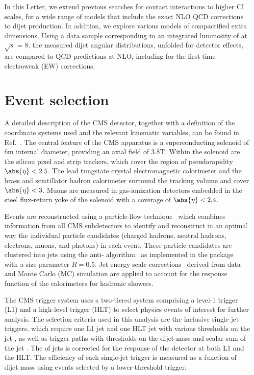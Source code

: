 \documentclass[11pt,twoside,a4paper,cmspaper,final,collab]{cms-tdr}
\begin{document}
In this Letter, we extend previous searches for contact
interactions to higher CI scales, for a wide range of models that
include the exact NLO QCD corrections to dijet production. In addition, we explore
various models of compactified extra dimensions. Using a data sample corresponding to an integrated luminosity of
\intlumi at $\sqrt s$ = 8\TeV, the measured dijet angular distributions, unfolded for
detector effects, are compared to QCD predictions at NLO, including
for the first time electroweak (EW) corrections.

\section{Event selection}

A detailed description of the CMS detector,
together with a definition of the coordinate
systems used and the relevant kinematic variables,
can be found in Ref.~\cite{bib_CMS}.
The central feature of the CMS apparatus is a superconducting solenoid of
6\unit{m} internal diameter, providing an axial field of
3.8\unit{T}. Within the solenoid are the silicon pixel and strip
trackers, which cover the region of pseudorapidity $\abs{\eta} < 2.5$.
The lead tungstate crystal electromagnetic calorimeter and the
brass and scintillator hadron calorimeter surround the tracking volume and
cover $\abs{\eta} < 3$.
Muons are measured in gas-ionization detectors embedded
in the steel flux-return yoke of the solenoid with a coverage of $\abs{\eta} <
2.4$.

Events are reconstructed using a particle-flow
technique~\cite{CMS-PAS-PFT-09-001,CMS-PAS-PFT-10-001} which combines
information from all CMS subdetectors to identify and reconstruct in
an optimal way the
individual particle candidates (charged hadrons, neutral hadrons,
electrons, muons, and photons) in each event. These particle
candidates are clustered into jets using the anti-\kt
algorithm~\cite{Cacciari:2008gp} as implemented in the \fastjet
package~\cite{Cacciari:2011ma} with a size parameter $R = 0.5$. Jet
energy scale corrections~\cite{bib_jecjinst} derived from data and
Monte Carlo (MC) simulation are applied
to account for the response function of the calorimeters for hadronic showers.

The CMS trigger system uses a two-tiered system comprising a level-1 trigger
(L1) and a high-level trigger (HLT) to select physics events of
interest for further analysis. The selection criteria used in this analysis
are the inclusive single-jet triggers, which require one L1 jet and one
HLT jet with various thresholds on the jet \pt, as well as trigger
paths with thresholds on the dijet mass and scalar sum of the jet
\pt.
The \pt of jets is
corrected for the response of
the detector at both L1 and the HLT\@. The efficiency of each single-jet trigger is measured as a function of dijet mass \mjj
using events selected by a lower-threshold trigger.
\end{document}
